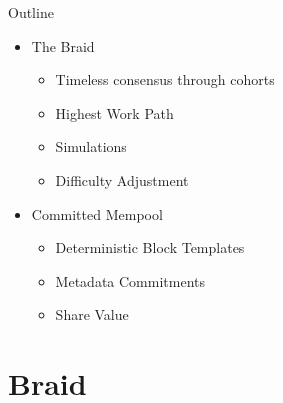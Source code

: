 \documentclass[tikz,mathserif,usenames,dvipsnames,svgnames,table]{beamer}
\newlength{\wideitemsep}
\let\olditem\item
\renewcommand{\item}{\setlength{\itemsep}{\wideitemsep}\olditem}
\begin{document}
\begin{frame}{Outline}
    \begin{itemize}
        \item The Braid
            \begin{itemize}
                \item Timeless consensus through cohorts
                \item Highest Work Path
                \item Simulations
                \item Difficulty Adjustment
            \end{itemize}
        \item Committed Mempool
            \begin{itemize}
                \item Deterministic Block Templates
                \item Metadata Commitments
                \item Share Value
            \end{itemize}
    \end{itemize}
\end{frame}
\section{Braid}
\end{document}

